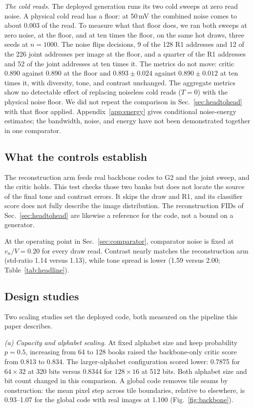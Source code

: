 \documentclass[reprint,amsmath,amssymb,aps,nofootinbib]{revtex4-2}
\begin{document}
\emph{The cold reads.} The deployed generation runs its two cold
sweeps at zero read noise. A physical cold read has a floor: at
50\,mV the combined noise comes to about 0.003 of the read. To
measure what that floor does, we ran both sweeps at zero noise, at
the floor, and at ten times the floor, on the same hot draws, three
seeds at $n = 1000$. The noise flips decisions, 9 of the 128 R1 addresses and
12 of the 226 joint addresses per image at the floor, and a quarter of
the R1 addresses and 52 of the joint addresses at ten times it. The
metrics do not move: critic 0.890 against 0.890 at the floor and
$0.893 \pm 0.024$ against $0.890 \pm 0.012$ at ten times it, with
diversity, tone, and contrast unchanged. The aggregate metrics show no detectable effect of replacing noiseless
cold reads ($T=0$) with the physical noise floor. We did not repeat the
comparison in Sec.~\ref{sec:headtohead} with that floor applied. Appendix~\ref{app:energy} gives conditional noise-energy
estimates; the bandwidth, noise, and energy have not been demonstrated
together in one comparator.

\subsection{What the controls establish}\label{sec:gap}

The reconstruction arm feeds real backbone codes to G2 and the joint
sweep, and the critic holds. This test checks those two banks but does not locate the source of the
final tone and contrast errors. It skips the draw and R1, and its
classifier score does not fully describe the image distribution. The reconstruction FIDs of Sec.~\ref{sec:headtohead}
are likewise a reference for the code, not a bound on a generator.

At the operating point in Sec.~\ref{sec:comparator}, comparator noise is
fixed at $v_n / V = 0.20$ for every draw read. Contrast nearly matches
the reconstruction arm (std-ratio 1.14 versus 1.13), while tone spread
is lower (1.59 versus 2.00; Table~\ref{tab:headline}).

\subsection{Design studies}\label{sec:studies}

Two scaling studies set the deployed code, both measured on the
pipeline this paper describes.

\emph{(a) Capacity and alphabet scaling.} At fixed alphabet size and keep probability $p=0.5$, increasing from 64
to 128 books raised the backbone-only critic score from 0.813 to 0.834.
The larger-alphabet configuration scored lower: 0.7875 for $64\times32$
at 320 bits versus 0.8344 for $128\times16$ at 512 bits. Both alphabet
size and bit count changed in this comparison. A global code
removes tile seams by construction: the mean pixel step across tile
boundaries, relative to elsewhere, is 0.93--1.07 for the global code
with real images at 1.100 (Fig.~\ref{fig:backbone}).
\end{document}
